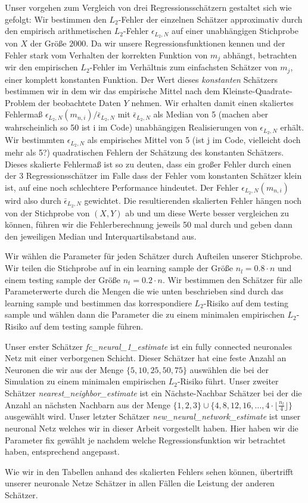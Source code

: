 Unser vorgehen zum Vergleich von drei Regressionsschätzern gestaltet sich wie gefolgt:
Wir bestimmen den $L_2$-Fehler der einzelnen Schätzer approximativ durch den empirisch arithmetischen $L_2$-Fehler $\epsilon_{L_2,N}$ auf einer unabhängigen Stichprobe von $X$ der Größe $2000$. Da wir unsere Regressionsfunktionen kennen und der Fehler stark vom Verhalten der korrekten Funktion von $m_j$ abhängt, betrachten wir den empirischen $L_2$-Fehler im Verhältnis zum einfachsten Schätzer von $m_j$, einer komplett konstanten Funktion. Der Wert dieses \textit{konstanten} Schätzers bestimmen wir in dem wir das empirische Mittel nach dem Kleinste-Quadrate-Problem der beobachtete Daten $Y$ nehmen. Wir erhalten damit einen skaliertes Fehlermaß $\epsilon_{L_2,N}(m_{n,i})/\bar{\epsilon}_{L_2,N}$ mit $\bar{\epsilon}_{L_2,N}$ als Median von 5 (machen aber wahrscheinlich so 50 ist i im Code) unabhängigen Realisierungen von $\epsilon_{L_2,N}$ erhält. Wir bestimmten $\epsilon_{L_2,N}$ als empirisches Mittel von 5 (ist j im Code, vielleicht doch mehr als 5?) quadratischen Fehlern der Schätzung des konstanten Schätzers. Dieses skalierte Fehlermaß ist so zu deuten, dass ein großer Fehler durch einen der 3 Regressionsschätzer im Falle dass der Fehler vom konstanten Schätzer klein ist, auf eine noch schlechtere Performance hindeutet. Der Fehler $\epsilon_{L_2,N}(m_{n,i})$ wird also durch $\bar{\epsilon}_{L_2,N}$ gewichtet.
Die resultierenden skalierten Fehler hängen noch von der Stichprobe von $(X, Y)$ ab und um diese Werte besser vergleichen zu können, führen wir die Fehlerberechnung jeweils 50 mal durch und geben dann den jeweiligen Median und Interquartilsabstand aus.

Wir wählen die Parameter für jeden Schätzer durch Aufteilen unserer Stichprobe. Wir teilen die Stichprobe auf in ein learning sample der Größe $n_l = 0.8 \cdot n$ und einem testing sample der Größe $n_t = 0.2 \cdot n$. Wir bestimmen den Schätzer für alle Parameterwerte durch die Mengen die wie unten beschrieben sind durch das learning sample und bestimmen das korrespondiere $L_2$-Risiko auf dem testing sample und wählen dann die Parameter die zu einem minimalen empirischen $L_2$-Risiko auf dem testing sample führen.

Unser erster Schätzer \textit{fc\_neural\_1\_estimate} ist ein fully connected neuronales Netz mit einer verborgenen Schicht. Dieser Schätzer hat eine feste Anzahl an Neuronen die wir aus der Menge $\{5, 10, 25, 50, 75\}$ auswählen die bei der Simulation zu einem minimalen empirischen $L_2$-Risiko führt.
Unser zweiter Schätzer \textit{nearest\_neighbor\_estimate} ist ein Nächste-Nachbar Schätzer bei der die Anzahl an nächsten Nachbarn aus der Menge $\{1, 2, 3\} \cup \{4, 8, 12, 16, \dots, 4 \cdot \lfloor\frac{n_l}{4}\rfloor\}$ ausgewählt wird.
Unser letzter Schätzer \textit{new\_neural\_network\_estimate} ist unser neuronal Netz welches wir in dieser Arbeit vorgestellt haben. Hier haben wir die Parameter fix gewählt je nachdem welche Regressionsfunktion wir betrachtet haben, entsprechend angepasst.

Wie wir in den Tabellen anhand des skalierten Fehlers sehen können, übertrifft unserer neuronale Netze Schätzer in allen Fällen die Leistung der anderen Schätzer. 

